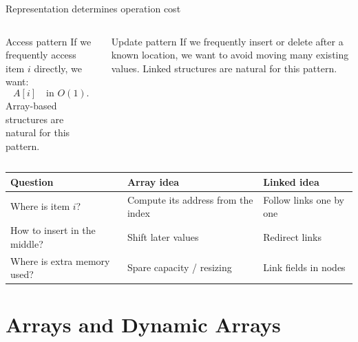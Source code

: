 \documentclass[aspectratio=169]{beamer}
\begin{document}
\begin{frame}{Representation determines operation cost}
\small
\begin{columns}[T,onlytextwidth]
\begin{column}{0.48\textwidth}
\begin{block}{Access pattern}
If we frequently access item $i$ directly, we want:
\[
A[i] \quad \text{in } O(1).
\]
Array-based structures are natural for this pattern.
\end{block}
\end{column}
\begin{column}{0.48\textwidth}
\begin{exampleblock}{Update pattern}
If we frequently insert or delete after a known location, we want to avoid
moving many existing values.
Linked structures are natural for this pattern.
\end{exampleblock}
\end{column}
\end{columns}

\vspace{0.35em}
\begin{center}
\renewcommand{\arraystretch}{1.18}
\begin{tabular}{L{0.24\textwidth}L{0.30\textwidth}L{0.30\textwidth}}
\toprule
\textbf{Question} & \textbf{Array idea} & \textbf{Linked idea} \\
\midrule
Where is item $i$? & Compute its address from the index & Follow links one by one \\
How to insert in the middle? & Shift later values & Redirect links \\
Where is extra memory used? & Spare capacity / resizing & Link fields in nodes \\
\bottomrule
\end{tabular}
\end{center}
\end{frame}

\section{Arrays and Dynamic Arrays}
\end{document}
